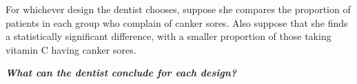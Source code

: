 \documentclass[a4paper, 12pt,twoside]{book}
\begin{document}
{{   For whichever design the dentist chooses, suppose she compares the proportion of patients in each group who complain of canker sores. Also suppose that she finds a statistically significant difference, with a smaller proportion of those taking vitamin C having canker sores.
   \vspace{0.3cm}
   
   \textbf{\textit{What can the dentist conclude for each design?}}
   
   
   
   }}
 
\end{document}
